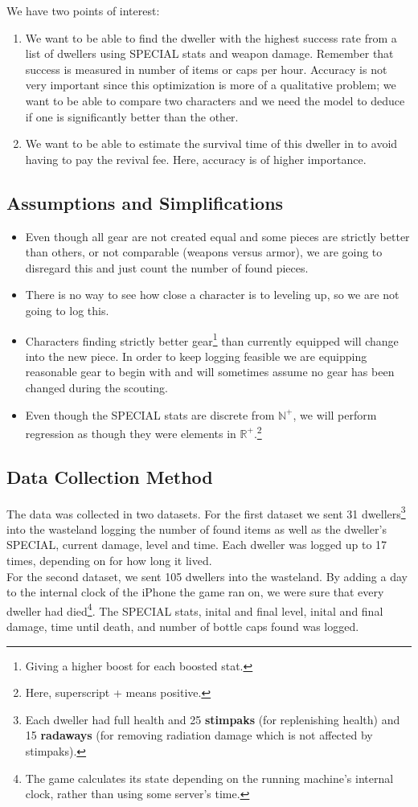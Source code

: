 We have two points of interest:
\begin{enumerate}
\item We want to be able to find the dweller with the highest success rate from a list of dwellers using SPECIAL stats and weapon damage. Remember that success is measured in number of items or caps per hour. Accuracy is not very important since this optimization is more of a qualitative problem; we want to be able to compare two characters and we need the model to deduce if one is significantly better than the other. 
\item We want to be able to estimate the survival time of this dweller in to avoid having to pay the revival fee. Here, accuracy is of higher importance.
\end{enumerate}

\subsection{Assumptions and Simplifications}
\begin{itemize}
\item Even though all gear are not created equal and some pieces are strictly better than others, or not comparable (weapons versus armor), we are going to disregard this and just count the number of found pieces.
\item There is no way to see how close a character is to leveling up, so we are not going to log this.
\item Characters finding strictly better gear\footnote{Giving a higher boost for each boosted stat.} than currently equipped will change into the new piece. In order to keep logging feasible we are equipping reasonable gear to begin with and will sometimes assume no gear has been changed during the scouting.
\item Even though the SPECIAL stats are discrete from $\mathbb{N}^+$, we will perform regression as though they were elements in $\mathbb{R}^+$.\footnote{Here, superscript + means positive.}
\end{itemize}

\subsection{Data Collection Method}
The data was collected in two datasets. For the first dataset we sent 31 dwellers\footnote{Each dweller had full health and 25 \textbf{stimpaks} (for replenishing health) and 15 \textbf{radaways} (for removing radiation damage which is not affected by stimpaks).} into the wasteland logging the number of found items as well as the dweller's SPECIAL, current damage, level and time. Each dweller was logged up to 17 times, depending on for how long it lived.\\

For the second dataset, we sent 105 dwellers into the wasteland. By adding a day to the internal clock of the iPhone the game ran on, we were sure that every dweller had died\footnote{The game calculates its state depending on the running machine's internal clock, rather than using some server's time.}. The SPECIAL stats, inital and final level, inital and final damage, time until death, and number of bottle caps found was logged.